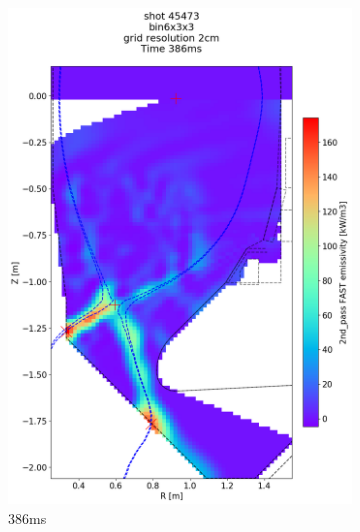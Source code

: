 \begin{figure}
     \centering
     \begin{subfigure}{0.395\linewidth}
         \centering
         \includegraphics[trim={75 90 0 190},clip,width=\textwidth]{Chapters/chapter2/figs/IRVB-MASTU_shot-45473_export_72.png}
         \vspace*{-6.5mm}
         \caption{386ms}
         \label{fig:45473_export2_1}
     \end{subfigure}
     \begin{subfigure}{0.395\linewidth}
         \centering

\end{subfigure}
\end{figure}
